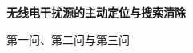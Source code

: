 \documentclass[UTF8,a4paper,zihao=-4,fontset=fandol]{ctexart}
\begin{document}
\begin{center}
  {\LARGE\bfseries 无线电干扰源的主动定位与搜索清除\par}
  \vspace{6pt}
  {\large 第一问、第二问与第三问\par}
\end{center}


\clearpage


\clearpage


\clearpage


\clearpage


\clearpage


\FloatBarrier
\end{document}
